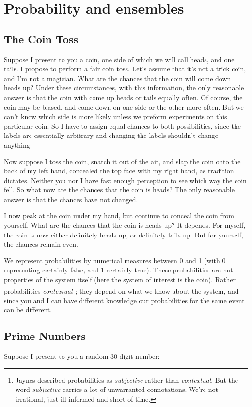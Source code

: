 \documentclass[Lectures.tex]{subfiles}
\begin{document}
\section{Probability and ensembles}


\subsection{The Coin Toss}
Suppose I present to you a coin, one side of which we will call heads, and one tails. I propose to perform a fair coin toss. Let's assume that it's not a trick coin, and I'm not a magician. What are the chances that the coin will come down heads up? Under these circumstances, with this information, the only reasonable answer is that the coin with come up heads or tails equally often. Of course, the coin may be biased, and come down on one side or the other more often. But we can't know which side is more likely unless we preform experiments on this particular coin. So I have to assign equal chances to both possibilities, since the labels are essentially arbitrary and changing the labels shouldn't change anything. 

Now suppose I toss the coin, snatch it out of the air, and slap the coin onto the back of my left hand, concealed the top face with my right hand, as tradition dictates. Neither you nor I have fast enough perception to see which way the coin fell.  So what now are the chances that the coin is heads? The only reasonable answer is that the chances have not changed. 

I now peak at the coin under my hand, but continue to conceal the coin from yourself. What are the chances that the coin is heads up? It depends. For myself, the coin is now either definitely heads up, or definitely tails up. But for yourself, the chances remain even. 

We represent probabilities by numerical measures between 0 and 1 (with 0 representing certainly false, and 1 certainly true). These probabilities are not properties of the system itself (here the system of interest is the coin). Rather probabilities {\sl contextual}\footnote{Jaynes described probabilities as {\sl subjective} rather than {\sl contextual}. But  the word {\sl subjective} carries a lot of unwarranted connotations. We're not irrational, just ill-informed and short of time.}; they depend on what we know about the system, and since you and I can have different knowledge our probabilities for the same event can be different. 


\subsection{Prime Numbers}
Suppose I present to you a random 30 digit number:
\end{document}
